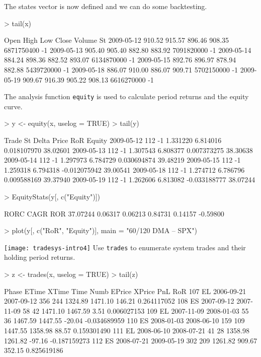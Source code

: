 \documentclass[a4]{article}
\newcommand{\code}[1]{\texttt{#1}}
\begin{document}
The states vector is now defined and we can do some backtesting.
\begin{Schunk}
\begin{Sinput}
> tail(x)
\end{Sinput}
\begin{Soutput}
             Open   High    Low  Close     Volume St
2009-05-12 910.52 915.57 896.46 908.35 6871750400 -1
2009-05-13 905.40 905.40 882.80 883.92 7091820000 -1
2009-05-14 884.24 898.36 882.52 893.07 6134870000 -1
2009-05-15 892.76 896.97 878.94 882.88 5439720000 -1
2009-05-18 886.07 910.00 886.07 909.71 5702150000 -1
2009-05-19 909.67 916.39 905.22 908.13 6616270000 -1
\end{Soutput}
\end{Schunk}
The analysis function \code{equity} is used to calculate period
returns and the equity curve.
\begin{Schunk}
\begin{Sinput}
> y <- equity(x, uselog = TRUE)
> tail(y)
\end{Sinput}
\begin{Soutput}
           Trade St    Delta    Price          RoR   Equity
2009-05-12   112 -1 1.331220 6.814016  0.018107970 38.02601
2009-05-13   112 -1 1.307543 6.808377  0.007373275 38.30638
2009-05-14   112 -1 1.297973 6.784729  0.030694874 39.48219
2009-05-15   112 -1 1.259318 6.794318 -0.012075942 39.00541
2009-05-18   112 -1 1.274712 6.786796  0.009588169 39.37940
2009-05-19   112 -1 1.262606 6.813082 -0.033188777 38.07244
\end{Soutput}
\begin{Sinput}
> EquityStats(y[, c("Equity")])
\end{Sinput}
\begin{Soutput}
    RORC     CAGR     ROR%       R2     VOLA    MAXDD 
37.07244  0.06317  0.06213  0.84731  0.14157 -0.59800 
\end{Soutput}
\begin{Sinput}
> plot(y[, c("RoR", "Equity")], main = "60/120 DMA -- SPX")
\end{Sinput}
\end{Schunk}
\texttt{[image: tradesys-intro4]}
Use \code{trades} to enumerate system trades and their holding
period returns.
\begin{Schunk}
\begin{Sinput}
> z <- trades(x, uselog = TRUE)
> tail(z)
\end{Sinput}
\begin{Soutput}
    Phase      ETime      XTime Time Numb  EPrice  XPrice    PnL          RoR
107    EL 2006-09-21 2007-09-12  356  244 1324.89 1471.10 146.21  0.264117052
108    ES 2007-09-12 2007-11-09   58   42 1471.10 1467.59   3.51  0.006027153
109    EL 2007-11-09 2008-01-03   55   36 1467.59 1447.55 -20.04 -0.034689959
110    ES 2008-01-03 2008-06-10  159  109 1447.55 1358.98  88.57  0.159301490
111    EL 2008-06-10 2008-07-21   41   28 1358.98 1261.82 -97.16 -0.187159273
112    ES 2008-07-21 2009-05-19  302  209 1261.82  909.67 352.15  0.825619186
\end{Soutput}
\end{Schunk}
\end{document}
